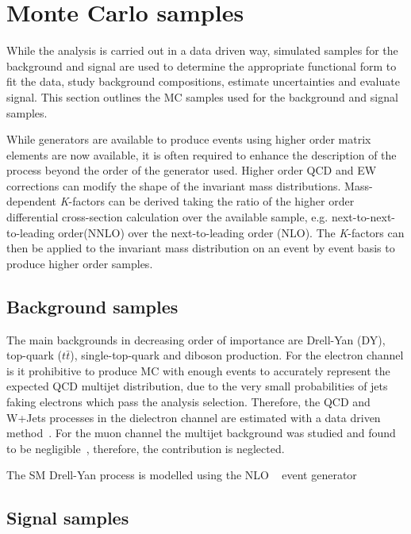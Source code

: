\clearpage

\section{Monte Carlo samples}
While the analysis is carried out in a data driven way, simulated samples for the background and signal are used to determine the appropriate functional form to fit the data, study background compositions, estimate uncertainties and evaluate signal. This section outlines the MC samples used for the background and signal samples.

While generators are available to produce events using higher order matrix elements are now available, it is often required to enhance the description of the process beyond the order of the generator used. Higher order QCD and EW corrections can modify the shape of the invariant mass distributions. Mass-dependent \emph{K}-factors can be derived taking the ratio of the higher order differential cross-section calculation over the available sample, e.g. next-to-next-to-leading order(NNLO) over the next-to-leading order (NLO). The \emph{K}-factors can then be applied to the invariant mass distribution on an event by event basis to produce higher order samples. 

\subsection{Background samples}
The main backgrounds in decreasing order of importance are Drell-Yan (DY), top-quark ($t\bar{t}$), single-top-quark and diboson production. For the electron channel is it prohibitive to produce MC with enough events to accurately represent the expected QCD multijet distribution, due to the very small probabilities of jets faking electrons which pass the analysis selection. Therefore, the QCD and W+Jets processes in the dielectron channel are estimated with a data driven method~\cite{EXOT-2016-05}. For the muon channel the multijet background was studied and found to be negligible~\cite{EXOT-2016-05}, therefore, the contribution is neglected. 

The SM Drell-Yan process is modelled using the NLO \POWHEGBOX~\cite{Alioli:2010xd,Frixione:2007vw} event generator

\subsection{Signal samples}
